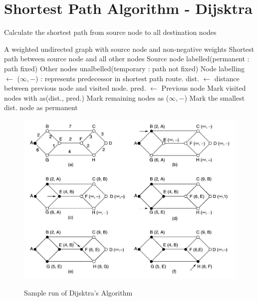 \documentclass[a4paper,oneside]{book}
\begin{document}
\section{Shortest Path Algorithm - Dijsktra}
\begin{algorithm}[H]
\caption{Calculate the shortest path from source node to all destination nodes}
\label{fig:cn_sh_pt_algo}
\begin{algorithmic}[1]
\REQUIRE A weighted undirected graph with source node and non-negative weights
\ENSURE Shortest path between source node and all other nodes
\STATE Source node labelled(permanent : path fixed)
\STATE Other nodes unalbelled(temporary : path not fixed)
\STATE Node labelling $\leftarrow$ ($\infty, -$) : represents predecessor in shortest path route.
\STATE dist. $\leftarrow$ distance between previous node and visited node.
\STATE pred. $\leftarrow$ Previous node
\STATE Mark visited nodes with as(dist., pred.)
\ENDWHILE
\STATE Mark remaining nodes as ($\infty, -$)
\STATE Mark the smallest dist. node as permanent
\ENDWHILE
\end{algorithmic}
\end{algorithm}
\begin{figure}[H]
\caption{Sample run of Dijsktra's Algorithm}
\includegraphics[scale=0.6]{Images/dijsktra_algo}
\label{fig:cn_dijsktra_algo}
\end{figure}
\end{document}
